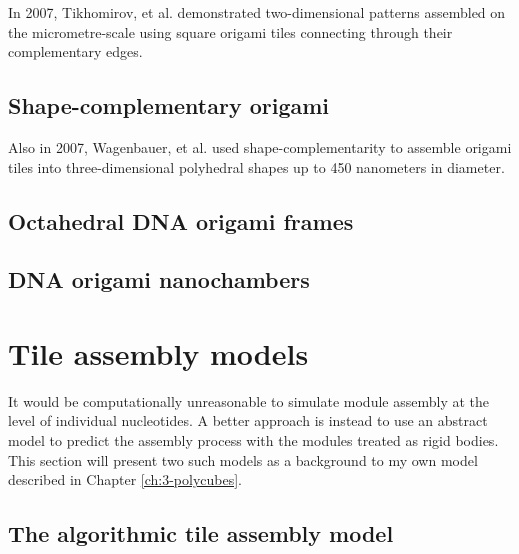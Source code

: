 In 2007, Tikhomirov, et al.\cite{tikhomirov2017fractal} demonstrated two-dimensional patterns assembled on the micrometre-scale using square origami tiles connecting through their complementary edges. 

\subsection{Shape-complementary origami}

Also in 2007, Wagenbauer, et al. \cite{wagenbauer2017gigadalton} used shape-complementarity to assemble origami tiles into three-dimensional polyhedral shapes up to 450 nanometers in diameter.

\subsection{Octahedral DNA origami frames}

\subsection{DNA origami nanochambers}

\section{Tile assembly models}
It would be computationally unreasonable to simulate module assembly at the level of individual nucleotides. A better approach is instead to use an abstract model to predict the assembly process with the modules treated as rigid bodies. This section will present two such models as a background to my own model described in Chapter \ref{ch:3-polycubes}.


\subsection{The algorithmic tile assembly model}


